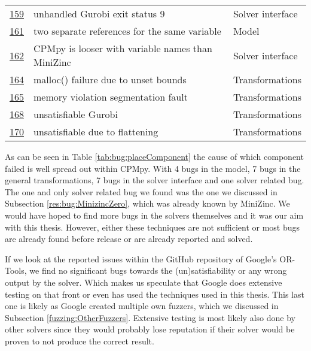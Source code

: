 \begin{table}[]
\begin{tabular}{lll}
		\href{https://github.com/CPMpy/cpmpy/issues/159}{159} & unhandled Gurobi exit status 9                    & Solver interface \\
		\href{https://github.com/CPMpy/cpmpy/issues/161}{161} & two separate references for the same variable     & Model            \\
		\href{https://github.com/CPMpy/cpmpy/issues/162}{162} & CPMpy is looser with variable names than MiniZinc & Solver interface \\
		\href{https://github.com/CPMpy/cpmpy/issues/164}{164} & malloc() failure due to unset bounds              & Transformations  \\
		\href{https://github.com/CPMpy/cpmpy/issues/165}{165} & memory violation segmentation fault               & Transformations  \\
		\href{https://github.com/CPMpy/cpmpy/issues/168}{168} & unsatisfiable Gurobi                              & Transformations  \\
		\href{https://github.com/CPMpy/cpmpy/issues/170}{170} & unsatisfiable due to flattening                   & Transformations  \\ \bottomrule        
	\end{tabular}
\end{table}

\label{res:PlaceOfBug}
As can be seen in Table \ref{tab:bug:placeComponent} the cause of which component failed is well spread out within CPMpy.
With 4 bugs in the model, 7 bugs in the general transformations, 7 bugs in the solver interface and one solver related bug. The one and only solver related bug we found was the one we discussed in Subsection \ref{res:bug:MinizincZero}, which was already known by MiniZinc. We would have hoped to find more bugs in the solvers themselves and it was our aim with this thesis. However, either these techniques are not sufficient or most bugs are already found before release or are already reported and solved.

If we look at the reported issues within the GitHub repository of Google’s OR-Tools, we find no significant bugs towards the (un)satisfiability or any wrong output by the solver. Which makes us speculate that Google does extensive testing on that front or even has used the techniques used in this thesis. This last one is likely as Google created multiple own fuzzers, which we discussed in Subsection \ref{fuzzing:OtherFuzzers}. Extensive testing is most likely also done by other solvers since they would probably lose reputation if their solver would be proven to not produce the correct result.

